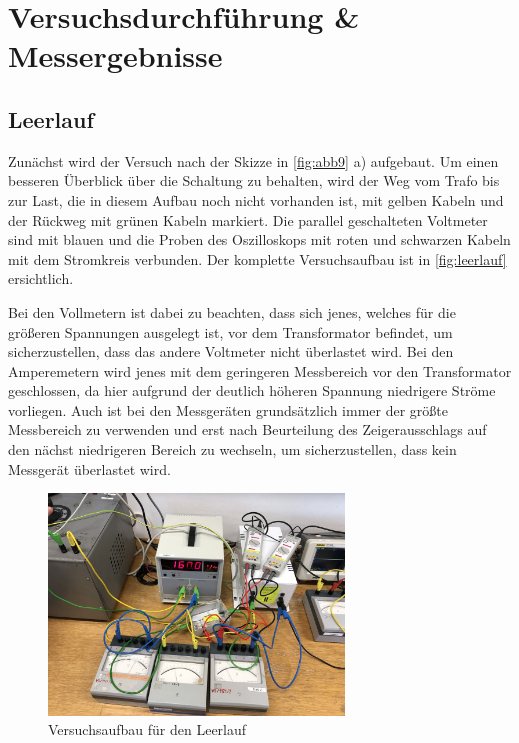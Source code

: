 \documentclass[11pt,ngerman]{scrartcl}
\begin{document}
\newpage

\section{Versuchsdurchführung \& Messergebnisse}\label{sec:Versuchsdurchführung}

\subsection{Leerlauf}

Zunächst wird der Versuch nach der Skizze in
\autoref{fig:abb9} a) aufgebaut. Um einen besseren
Überblick über die Schaltung zu behalten, wird der
Weg vom Trafo bis zur Last, die in diesem Aufbau
noch nicht vorhanden ist, mit gelben Kabeln und der
Rückweg mit grünen Kabeln markiert. Die parallel
geschalteten Voltmeter sind mit blauen und die
Proben des Oszilloskops mit roten und schwarzen
Kabeln mit dem Stromkreis verbunden. Der komplette
Versuchsaufbau ist in \autoref{fig:leerlauf}
ersichtlich.

Bei den Vollmetern ist dabei zu beachten, dass sich jenes, welches für die
größeren Spannungen ausgelegt ist, vor dem Transformator befindet, um
sicherzustellen, dass das andere Voltmeter nicht überlastet wird. Bei den
Amperemetern wird jenes mit dem geringeren Messbereich vor den Transformator
geschlossen, da hier aufgrund der deutlich höheren Spannung niedrigere Ströme
vorliegen. Auch ist bei den Messgeräten grundsätzlich immer der größte
Messbereich zu verwenden und erst nach Beurteilung des Zeigerausschlags auf den
nächst niedrigeren Bereich zu wechseln, um sicherzustellen, dass kein Messgerät
überlastet wird.

\begin{figure}[H]
	\begin{center}
		\includegraphics[width=0.7\textwidth]{leerlauf}
	\end{center}
	\caption{Versuchsaufbau für den Leerlauf}
	\label{fig:leerlauf}
\end{figure}
\end{document}
